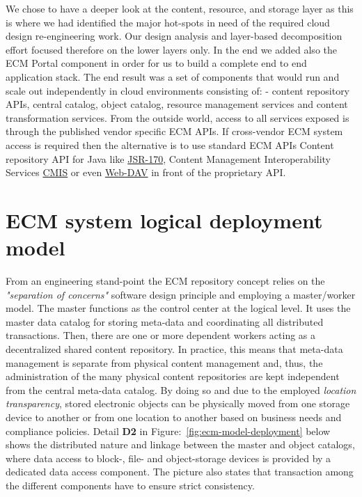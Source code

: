 \documentclass[EPiC]{easychair} %
\begin{document}
    \noindent We chose to have a deeper look at the content, resource, and storage layer as this is where we had identified the major hot-spots in need of the required cloud design re-engineering work. Our design analysis and layer-based decomposition effort focused therefore on the lower layers only. In the end we added also the ECM Portal component in order for us to build a complete end to end application stack.
    The end result was a set of components that would run and scale out independently in cloud environments consisting of: - content repository APIs, central catalog, object catalog, resource management services and content transformation services. From the outside world, access to all services exposed is through the published vendor specific ECM APIs. If cross-vendor ECM system access is required then the alternative is to use standard ECM APIs Content repository API for Java like \href{https://en.wikipedia.org/wiki/Content_repository_API_for_Java}{JSR-170}, Content Management Interoperability Services \href{https://en.wikipedia.org/wiki/Content_Management_Interoperability_Services}{CMIS} or even \href{https://en.wikipedia.org/wiki/WebDAV}{Web-DAV} in front of the proprietary API.
    
\section{ECM system logical deployment model}
\label{sect:ecm-deployment-model}
    From an engineering stand-point the ECM repository concept relies on the \textit{"separation of concerns"} software design principle and employing a master/worker model. The master functions as the control center at the logical level. It uses the master data catalog for storing meta-data and coordinating all distributed transactions. Then, there are one or more dependent workers acting as a decentralized shared content repository. In practice, this means that meta-data management is separate from physical content management and, thus, the administration of the many physical content repositories are kept independent from the central meta-data catalog. By doing so and due to the employed \textit{location transparency}, stored electronic objects can be physically moved from one storage device to another or from one location to another based on business needs and compliance policies. Detail \textbf{D2} in Figure:~\ref{fig:ecm-model-deployment} below shows the distributed nature and linkage between the master and object catalogs, where data access to block-, file- and object-storage devices is provided by a dedicated data access component. The picture also states that transaction among the different components have to ensure strict consistency.    
    
\end{document}
